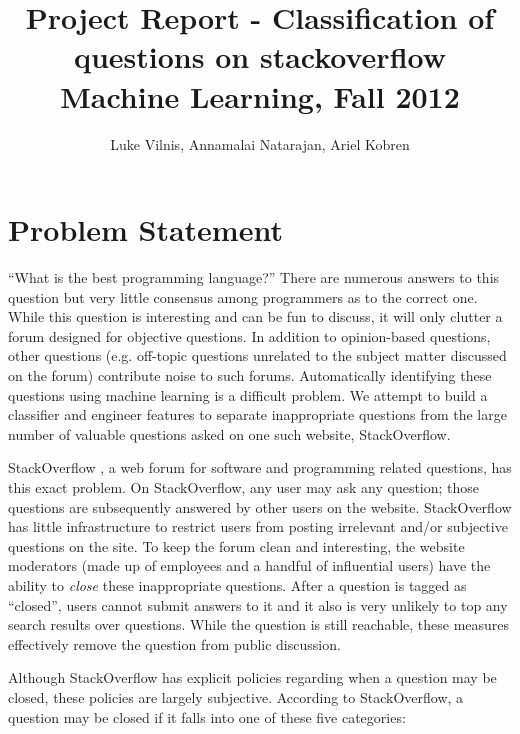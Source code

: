 \documentclass[11pt]{article}
\title{Project Report - Classification of questions on stackoverflow\\ Machine Learning, Fall 2012}
\author{Luke Vilnis, Annamalai Natarajan, Ariel Kobren}
\begin{document}
\sloppy

\maketitle

\section{Problem Statement}

``What is the best programming language?'' There are numerous answers
to this question but very little consensus among programmers as to the
correct one. While this question is interesting and can be fun to
discuss, it will only clutter a forum designed for objective questions.
In addition to opinion-based questions, other questions (e.g. off-topic questions unrelated to the
subject matter discussed on the forum) contribute noise to such forums. Automatically identifying these questions using machine learning is a difficult problem. We attempt to build a classifier and engineer features to separate inappropriate questions from the large number of valuable questions asked on one such website, StackOverflow.

 StackOverflow \cite{website:stackoverflow}, a web forum
for software and programming related questions,
has this exact problem. On StackOverflow, any user may ask any
question; those questions are subsequently answered by other users on
the website. StackOverflow has little infrastructure to restrict users
from posting irrelevant and/or subjective questions on the site. To
keep the forum clean and interesting, the website moderators (made up of employees and a
handful of influential users) have the ability to \emph{close} these
inappropriate questions. After a question is tagged as ``closed'', users cannot submit answers to it and it also is very unlikely to top any search results over questions. While the question
is still reachable, these measures effectively remove the question
from public discussion.

 Although StackOverflow has explicit policies regarding when
a question may be closed, these policies are largely
subjective. According to StackOverflow, a question may be closed if it
falls into one of these five categories:
\end{document}
